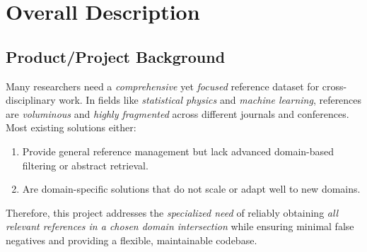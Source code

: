 \documentclass[12pt]{article}
\begin{document}
\newpage

\section{Overall Description}

\subsection{Product/Project Background}
Many researchers need a \emph{comprehensive} yet \emph{focused} reference dataset for cross-disciplinary work. In fields like \emph{statistical physics} and \emph{machine learning}, references are \emph{voluminous} and \emph{highly fragmented} across different journals and conferences. Most existing solutions either:
\begin{enumerate}
  \item Provide general reference management but lack advanced domain-based filtering or abstract retrieval.
  \item Are domain-specific solutions that do not scale or adapt well to new domains.
\end{enumerate}

Therefore, this project addresses the \emph{specialized need} of reliably obtaining \emph{all relevant references in a chosen domain intersection} while ensuring minimal false negatives and providing a flexible, maintainable codebase.
\end{document}
